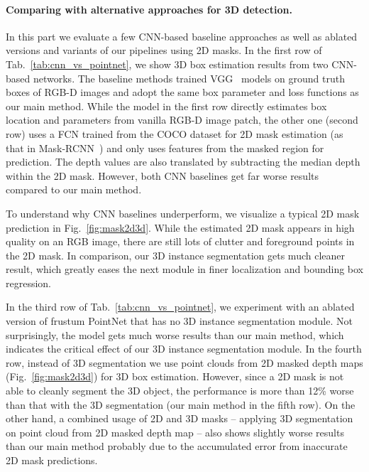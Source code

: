 \documentclass[10pt,twocolumn,letterpaper]{article}
\begin{document}
\paragraph{Comparing with alternative approaches for 3D detection.} In this part we evaluate a few CNN-based baseline approaches as well as ablated versions and variants of our pipelines using 2D masks.
In the first row of Tab.~\ref{tab:cnn_vs_pointnet}, we show 3D box estimation results from two CNN-based networks. The baseline methods trained VGG~\cite{simonyan2014very} models on ground truth boxes of RGB-D images and adopt the same box parameter and loss functions as our main method. While the model in the first row directly estimates box location and parameters from vanilla RGB-D image patch, the other one (second row) uses a FCN trained from the COCO dataset for 2D mask estimation (as that in Mask-RCNN~\cite{he2017mask}) and only uses features from the masked region for prediction. The depth values are also translated by subtracting the median depth within the 2D mask. However, both CNN baselines get far worse results compared to our main method.

To understand why CNN baselines underperform, we visualize a typical 2D mask prediction in Fig.~\ref{fig:mask2d3d}. While the estimated 2D mask appears in high quality on an RGB image, there are still lots of clutter and foreground points in the 2D mask. In comparison, our 3D instance segmentation gets much cleaner result, which greatly eases the next module in finer localization and bounding box regression.



In the third row of Tab.~\ref{tab:cnn_vs_pointnet}, we experiment with an ablated version of frustum PointNet that has no 3D instance segmentation module. Not surprisingly, the model gets much worse results than our main method, which indicates the critical effect of our 3D instance segmentation module. In the fourth row, instead of 3D segmentation we use point clouds from 2D masked depth maps (Fig.~\ref{fig:mask2d3d}) for 3D box estimation. However, since a 2D mask is not able to cleanly segment the 3D object, the performance is more than 12\% worse than that with the 3D segmentation (our main method in the fifth row). On the other hand, a combined usage of 2D and 3D masks -- applying 3D segmentation on point cloud from 2D masked depth map -- also shows slightly worse results than our main method probably due to the accumulated error from inaccurate 2D mask predictions.
\end{document}
